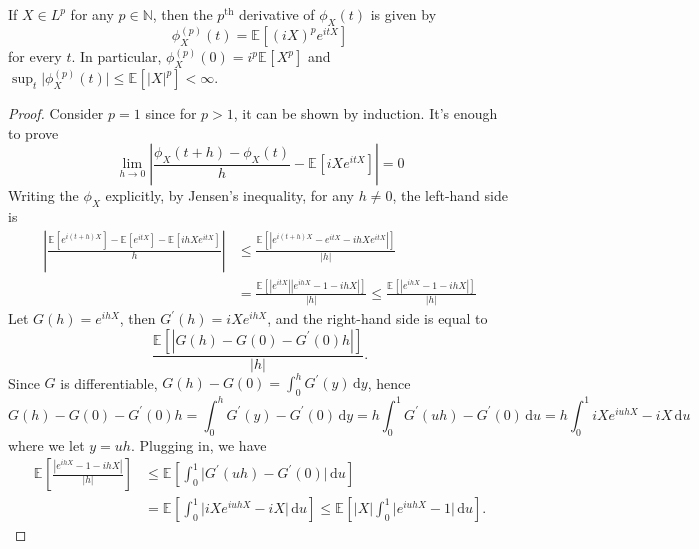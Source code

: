 \begin{theorem}\label{thm:characteristic-function-derivative}
	If \(X \in L ^p\) for any \(p \in \mathbb{N} \), then the \(p^{\text{th} }\) derivative of \(\phi _X(t)\) is given by
	\[
		\phi _X^{(p)} (t) = \mathbb{E}_{}[(iX)^p e^{itX}]
	\]
	for every \(t\). In particular, \(\phi _X^{(p)}(0) = i^p \mathbb{E}_{}[X^p] \) and \(\sup _t \vert \phi _X^{(p)} (t) \vert \leq \mathbb{E}_{}[\vert X \vert ^p] < \infty \).
\end{theorem}
\begin{proof}
	Consider \(p = 1\) since for \(p > 1\), it can be shown by induction. It's enough to prove
	\[
		\lim_{h \to 0} \left\vert \frac{\phi _X(t + h) - \phi _X(t)}{h} - \mathbb{E}_{}\left[i X e^{itX}\right] \right\vert = 0
	\]
	Writing the \(\phi _X\) explicitly, by Jensen's inequality, for any \(h \neq 0\), the left-hand side is
	\[
		\begin{split}
			\left\vert \frac{\mathbb{E}_{}\left[e^{i(t + h) X}\right] - \mathbb{E}_{}\left[e^{itX}\right] - \mathbb{E}_{}\left[ihX e^{itX}\right] }{h} \right\vert
			 & \leq \frac{\mathbb{E}_{}\left[\left\vert e^{i(t + h) X} - e^{itX} - ihX e^{itX} \right\vert \right] }{\vert h \vert }             \\
			 & = \frac{\mathbb{E}_{}\left[\left\vert e^{i t X}  \right\vert \left\vert e^{i h X} - 1 - ihX \right\vert \right] }{\vert h \vert }
			\leq \frac{\mathbb{E}_{}\left[\left\vert e^{i h X} - 1 - ihX \right\vert \right] }{\vert h \vert }
		\end{split}
	\]
	Let \(G(h) = e^{ihX}\), then \(G^{\prime} (h) = iX e^{ihX}\), and the right-hand side is equal to
	\[
		\frac{\mathbb{E}_{}\left[\left\vert G(h) - G(0) - G^{\prime} (0) h \right\vert \right]}{\vert h \vert } .
	\]
	Since \(G\) is differentiable, \(G(h)-G(0) = \int_{0}^{h} G^{\prime} (y) \,\mathrm{d}y \), hence
	\[
		G(h) - G(0) - G^{\prime} (0) h
		= \int_{0}^{h} G^{\prime} (y) - G^{\prime} (0) \,\mathrm{d}y
		= h \int_{0}^{1} G^{\prime} (uh) - G^{\prime} (0) \,\mathrm{d}u
		= h \int_{0}^{1} iX e^{iuhX} - iX \,\mathrm{d}u
	\]
	where we let \(y = u h\). Plugging in, we have
	\[
		\begin{split}
			\mathbb{E}_{}\left[\frac{\left\vert e^{ihX} - 1 - ihX \right\vert }{\vert h \vert }\right]
			 & \leq \mathbb{E}_{}\left[\int_{0}^{1} \vert G^{\prime} (uh) - G^{\prime} (0) \vert \,\mathrm{d}u \right] \\
			 & = \mathbb{E}_{}\left[\int_{0}^{1} \vert iX e^{iuhX} - iX \vert \,\mathrm{d}u \right]
			\leq \mathbb{E}_{}\left[\vert X \vert \int_{0}^{1} \vert e^{iuhX} - 1 \vert \,\mathrm{d}u \right].

\end{split}\]
\end{proof}
